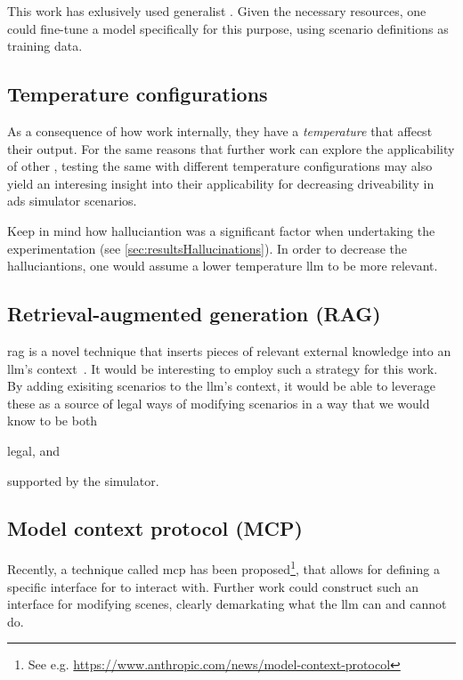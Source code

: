 This work has exlusively used generalist . Given the necessary resources, one could
fine-tune a model specifically for this purpose, using scenario definitions as training data.

\subsection{Temperature configurations}
As a consequence of how  work internally, they have a \emph{temperature} that
affecst their output. For the same reasons that further work can explore the applicability of other
, testing the same  with different temperature configurations may
also yield an interesing insight into their applicability for decreasing driveability in
\acrshort{ads} simulator scenarios.

Keep in mind how halluciantion was a significant factor when undertaking the experimentation (see
\cref{sec:resultsHallucinations}). In order to decrease the halluciantions, one would assume a lower
temperature \acrshort{llm} to be more relevant.

\subsection{Retrieval-augmented generation (RAG)}

\acrfull{rag} is a novel technique that inserts pieces of relevant external knowledge into an
\acrshort{llm}'s context~\cite[88-89]{llmSurvey}. It would be interesting to employ such a strategy
for this work. By adding exisiting scenarios to the \acrfull{llm}'s context, it would be able to
leverage these as a source of legal ways of modifying scenarios in a way that we would know to be
both \begin{inparaenum}
    \item legal, and
    \item supported by the simulator.
\end{inparaenum}

\subsection{Model context protocol (MCP)}

Recently, a technique called \acrfull{mcp} has been proposed\footnote{See e.g.
    \url{https://www.anthropic.com/news/model-context-protocol}}, that allows for defining a specific
interface for  to interact with. Further work could construct such an interface for
modifying scenes, clearly demarkating what the \acrshort{llm} can and cannot do.

